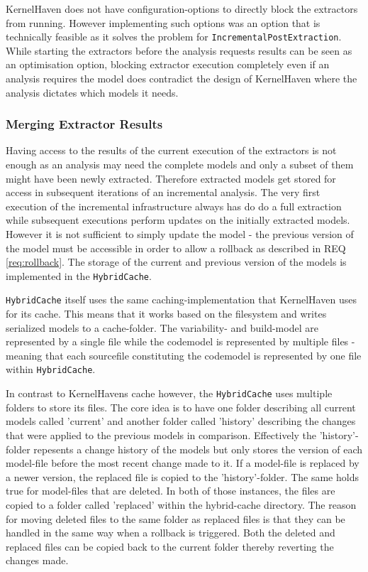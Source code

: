 \documentclass[a4paper]{article}
\begin{document}
KernelHaven does not have configuration-options to directly block the extractors from running. However implementing such options was an option that is technically feasible as it solves the problem for \texttt{IncrementalPostExtraction}. While starting the extractors before the analysis requests results can be seen as an optimisation option, blocking extractor execution completely even if an analysis requires the model does contradict the design of KernelHaven where the analysis dictates which models it needs.

\subsubsection{Merging Extractor Results}

Having access to the results of the current execution of the extractors is not enough as an analysis may need the complete models and only a subset of them might have been newly extracted. Therefore extracted models get stored for access in subsequent iterations of an incremental analysis. The very first execution of the incremental infrastructure always has do do a full extraction while subsequent executions perform updates on the initially extracted models. However it is not sufficient to simply update the model - the previous version of the model must be accessible in order to allow a rollback as described in REQ \ref{req:rollback}. The storage of the current and previous version of the models is implemented in the \texttt{HybridCache}.

\texttt{HybridCache} itself uses the same caching-implementation that KernelHaven uses for its cache. This means that it works based on the filesystem and writes serialized models to a cache-folder. The variability- and build-model are represented by a single file while the codemodel is represented by multiple files - meaning that each sourcefile constituting the codemodel is represented by one file within \texttt{HybridCache}.
 
 In contrast to KernelHavens cache however, the \texttt{HybridCache} uses multiple folders to store its files. The core idea is to have one folder describing all current models called 'current' and another folder called 'history' describing the changes that were applied to the previous models in comparison. Effectively the 'history'-folder repesents a change history of the models but only stores the version of each model-file before the most recent change made to it. 
 If a model-file is replaced by a newer version, the replaced file is copied to the 'history'-folder. The same holds true for model-files that are deleted. In both of those instances, the files are copied to a folder called 'replaced' within the hybrid-cache directory. The reason for moving deleted files to the same folder as replaced files is that they can be handled in the same way when a rollback is triggered. Both the deleted and replaced files can be copied back to the current folder thereby reverting the changes made.
 
\end{document}
